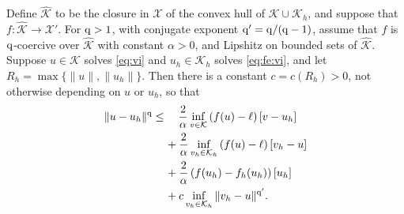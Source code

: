 \documentclass[hidelinks,onefignum,onetabnum,final]{siamart220329}  %
\newcommand{\cK}{\mathcal{K}}
\newcommand{\cX}{\mathcal{X}}
\newcommand{\hcK}{\widehat{\cK}}
\newcommand{\qq}{{\text{\textnormal{q}}}}
\begin{document}
\begin{theorem} \label{thm:abstractestimate}  Define $\hcK$ to be the closure in $\cX$ of the convex hull of $\cK \cup \cK_h$, and suppose that $f:\hcK \to \cX'$.  For $\qq>1$, with conjugate exponent $\qq'=\qq/(\qq-1)$, assume that $f$ is $\qq$-coercive over $\hcK$ with constant $\alpha>0$, and Lipshitz on bounded sets of $\hcK$.  Suppose $u\in\cK$ solves \eqref{eq:vi} and $u_h\in\cK_h$ solves \eqref{eq:fe:vi}, and let $R_h=\max\{\|u\|,\|u_h\|\}$.  Then there is a constant $c=c(R_h)>0$, not otherwise depending on $u$ or $u_h$, so that
\begin{align}
\|u-u_h\|^\qq &\le \quad \frac{2}{\alpha} \inf_{v\in\cK} \left(f(u)-\ell\right)[v-u_h] \label{eq:abstractestimate} \\
   &\quad\, + \frac{2}{\alpha} \inf_{v_h\in\cK_h} \left(f(u)-\ell\right)[v_h-u] \notag \\
   &\quad\, + \frac{2}{\alpha} \left(f(u_h)-f_h(u_h)\right)[u_h] \notag \\
   &\quad\, + c \inf_{v_h\in\cK_h} \|v_h - u\|^{\qq'}. \notag
\end{align}
\end{theorem}
\end{document}
